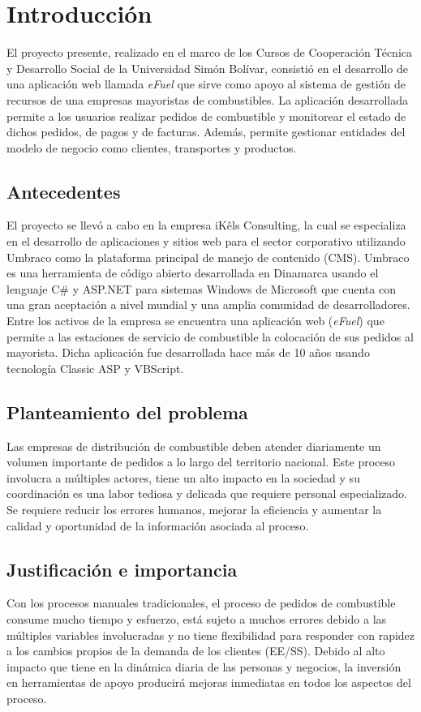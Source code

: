 \chapter*{Introducción}

El proyecto presente, realizado en el marco de los Cursos de Cooperación Técnica y Desarrollo Social de la Universidad Simón Bolívar, consistió en el desarrollo de una aplicación web llamada \emph{eFuel} que sirve como apoyo al sistema de gestión de recursos de una empresas mayoristas de combustibles. La aplicación desarrollada permite a los usuarios realizar pedidos de combustible y monitorear el estado de dichos pedidos, de pagos y de facturas. Además, permite gestionar entidades del modelo de negocio como clientes, transportes y productos.

\section*{Antecedentes}
El proyecto se llevó a cabo en la empresa iKêls Consulting, la cual se especializa en el desarrollo de aplicaciones y sitios web para el sector corporativo utilizando Umbraco como la plataforma principal de manejo de  contenido (CMS). Umbraco es una herramienta de código abierto desarrollada en Dinamarca usando el lenguaje C\# y ASP.NET para sistemas Windows de Microsoft que cuenta con una gran aceptación a nivel mundial y una amplia comunidad de desarrolladores. Entre los activos de la empresa se encuentra una aplicación web (\emph{eFuel}) que permite a las estaciones de servicio de combustible la colocación de sus pedidos al mayorista. Dicha aplicación fue desarrollada hace más de 10 años usando tecnología Classic ASP y VBScript.

\section*{Planteamiento del problema}
Las empresas de distribución de combustible deben atender diariamente un volumen importante de pedidos a lo largo del territorio nacional. Este proceso involucra a múltiples actores, tiene un alto impacto en la sociedad y su coordinación es una labor tediosa y delicada que requiere personal especializado. Se requiere reducir los errores humanos, mejorar la eficiencia y aumentar la calidad y oportunidad de la información asociada al proceso.

\section*{Justificación e importancia}
Con los procesos manuales tradicionales, el proceso de pedidos de combustible consume mucho tiempo y esfuerzo, está sujeto a muchos errores debido a las múltiples variables involucradas y no tiene flexibilidad para responder con rapidez a los cambios propios de la demanda de los clientes (EE/SS). Debido al alto impacto que tiene en la dinámica diaria de las personas y negocios, la inversión en herramientas de apoyo producirá mejoras inmediatas en todos los aspectos del proceso.

